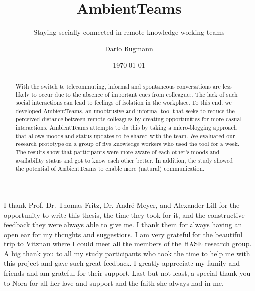 \documentclass{seal_thesis}
\date{\today}
\title{AmbientTeams}
\subtitle{Staying socially connected in remote knowledge working teams}
\author{Dario Bugmann}
\begin{document}
\maketitle

\frontmatter

\begin{acknowledgements}
    I thank Prof. Dr. Thomas Fritz, Dr. André Meyer, and Alexander Lill for the opportunity to write this thesis, the time they took for it, and the constructive feedback they were always able to give me. I thank them for always having an open ear for my thoughts and suggestions. I am very grateful for the beautiful trip to Vitznau where I could meet all the members of the HASE research group. A big thank you to all my study participants who took the time to help me with this project and gave such great feedback. I greatly appreciate my family and friends and am grateful for their support. Last but not least, a special thank you to Nora for all her love and support and the faith she always had in me.
\end{acknowledgements}

\begin{abstract}
    With the switch to telecommuting, informal and spontaneous conversations are less likely to occur due to the absence of important cues from colleagues. The lack of such social interactions can lead to feelings of isolation in the workplace. To this end, we developed AmbientTeams, an unobtrusive and informal tool that seeks to reduce the perceived distance between remote colleagues by creating opportunities for more casual interactions. AmbientTeams attempts to do this by taking a micro-blogging approach that allows moods and status updates to be shared with the team. We evaluated our research prototype on a group of five knowledge workers who used the tool for a week. The results show that participants were more aware of each other's moods and availability status and got to know each other better. In addition, the study showed the potential of AmbientTeams to enable more (natural) communication.
\end{abstract}
\end{document}
